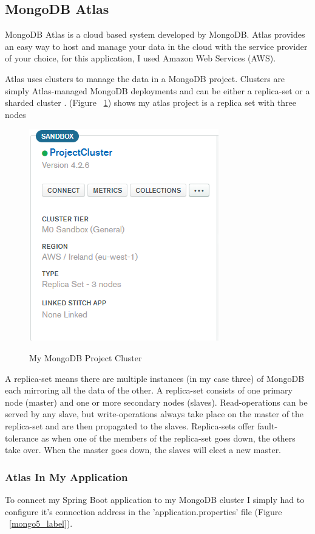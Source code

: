 \subsection{MongoDB Atlas}
MongoDB Atlas is a cloud based system developed by MongoDB. Atlas provides an easy way to host and manage your data in the cloud with the service provider of your choice, for this application, I used Amazon Web Services (AWS).

Atlas uses clusters to manage the data in a MongoDB project. Clusters are simply Atlas-managed MongoDB deployments and can be either a replica-set or a sharded cluster \cite{Mongo:clusters}. (Figure ~\ref{mongo3_label}) shows my atlas project is a replica set with three nodes

\begin{figure}[h]
    \centering
    \includegraphics[scale=0.4]{Images/mongo3.png} 
    \label{mongo3_label}
    \caption{My MongoDB Project Cluster}
\end{figure}
A replica-set means there are multiple instances (in my case three) of MongoDB each mirroring all the data of the other. A replica-set consists of one primary node (master) and one or more secondary nodes (slaves). Read-operations can be served by any slave, but write-operations always take place on the master of the replica-set and are then propagated to the slaves. Replica-sets offer fault-tolerance as when one of the members of the replica-set goes down, the others take over. When the master goes down, the slaves will elect a new master.

\newpage
\subsubsection{Atlas In My Application}
To connect my Spring Boot application to my MongoDB cluster I simply had to configure it's connection address in the 'application.properties' file (Figure ~\ref{mongo5_label}).

